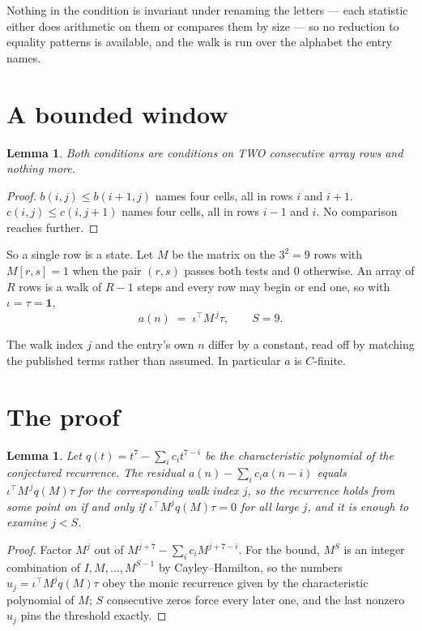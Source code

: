 \documentclass[11pt,a4paper]{article}
\theoremstyle{plain}
\newtheorem{lemma}[theorem]{Lemma}
\theoremstyle{definition}
\begin{document}
Nothing in the condition is invariant under renaming the letters --- each statistic either does
arithmetic on them or compares them by size --- so no reduction to equality patterns is
available, and the walk is run over the alphabet the entry names.

\section{A bounded window}

\begin{lemma}\label{lem:win}
Both conditions are conditions on TWO consecutive array rows and nothing more.
\end{lemma}

\begin{proof}
$b(i,j)\le b(i{+}1,j)$ names four cells, all in rows $i$ and $i+1$. $c(i,j)\le c(i,j{+}1)$
names four cells, all in rows $i-1$ and $i$. No comparison reaches further.
\end{proof}

So a single row is a state. Let $M$ be the matrix on the $3^{2}=9$ rows with
$M[r,s]=1$ when the pair $(r,s)$ passes both tests and $0$ otherwise. An array of $R$ rows is a
walk of $R-1$ steps and every row may begin or end one, so with $\iota=\tau=\mathbf{1}$,
\[
a(n)\;=\;\iota^{\!\top}M^{\,j}\tau ,\qquad S=9.
\]

The walk index $j$ and the entry's own $n$ differ by a constant, read off by matching the
published terms rather than assumed. In particular $a$ is $C$-finite.

\section{The proof}

\begin{lemma}\label{lem:crit}
Let $q(t)=t^{7}-\sum_i c_it^{7-i}$ be the characteristic polynomial of the
conjectured recurrence. The residual $a(n)-\sum_ic_ia(n-i)$ equals
$\iota^{\!\top}M^{\,j}q(M)\tau$ for the corresponding walk index $j$, so the recurrence
holds from some point on if and only if $\iota^{\!\top}M^{j}q(M)\tau=0$ for all large $j$,
and it is enough to examine $j<S$.
\end{lemma}

\begin{proof}
Factor $M^{j}$ out of $M^{j+7}-\sum_ic_iM^{j+7-i}$. For the bound, $M^{S}$
is an integer combination of $I,M,\dots,M^{S-1}$ by Cayley--Hamilton, so the numbers
$u_j=\iota^{\!\top}M^{j}q(M)\tau$ obey the monic recurrence given by the characteristic
polynomial of $M$; $S$ consecutive zeros force every later one, and the last nonzero $u_j$
pins the threshold exactly.
\end{proof}
\end{document}
